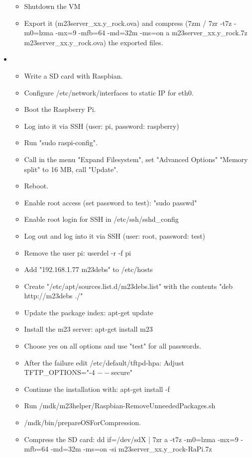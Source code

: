\begin{itemize}
\begin{itemize}
		\item Shutdown the VM
		\item Export it (m23server\_xx.y\_rock.ova) and compress (7zm / 7zr -t7z -m0=lzma -mx=9 -mfb=64 -md=32m -ms=on a m23server\_xx.y\_rock.7z m23server\_xx.y\_rock.ova) the exported files.
	\end{itemize}
\item
	\begin{itemize}
		\item Write a SD card with Raspbian.
		\item Configure /etc/network/interfaces to static IP for eth0.
		\item Boot the Raspberry Pi.
		\item Log into it via SSH (user: pi, password: raspberry)
		\item Run "sudo raspi-config".
		\item Call in the menu "Expand Filesystem", set "Advanced Options" "Memory split" to 16 MB, call "Update".
		\item Reboot.
		\item Enable root access (set password to test): "sudo passwd"
		\item Enable root login for SSH in /etc/ssh/sshd\_config
		\item Log out and log into it via SSH (user: root, password: test)
		\item Remove the user pi: userdel -r -f pi
		\item Add "192.168.1.77 m23debs" to /etc/hosts
		\item Create "/etc/apt/sources.list.d/m23debs.list" with the contents "deb http://m23debs ./"
		\item Update the package index: apt-get update
		\item Install the m23 server: apt-get install m23
		\item Choose yes on all options and use "test" for all passwords.
		\item After the failure edit /etc/default/tftpd-hpa: Adjust TFTP\_OPTIONS="-4 $--$secure"
		\item Continue the installation with: apt-get install -f
		\item Run /mdk/m23helper/Raspbian-RemoveUnneededPackages.sh
		\item /mdk/bin/prepareOSForCompression.
		\item Compress the SD card: dd if=/dev/sdX | 7zr a -t7z -m0=lzma -mx=9 -mfb=64 -md=32m -ms=on -si m23server\_xx.y\_rock-RaPi.7z
	\end{itemize}
\end{itemize}


